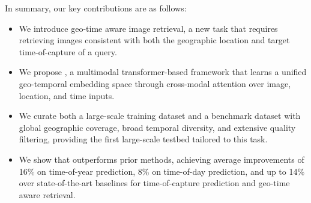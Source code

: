 \noindent In summary, our key contributions are as follows:
\begin{itemize}
    \item We introduce geo-time aware image retrieval, a new task that requires retrieving images consistent with both the geographic location and target time-of-capture of a query.
    \item We propose \tiger, a multimodal transformer-based framework that learns a unified geo-temporal embedding space through cross-modal attention over image, location, and time inputs.
    \item We curate both a large-scale training dataset and a benchmark dataset with global geographic coverage, broad temporal diversity, and extensive quality filtering, providing the first large-scale testbed tailored to this task.
    \item We show that \tiger outperforms prior methods, achieving average improvements of 16\% on time-of-year prediction, 8\% on time-of-day prediction, and up to 14\% over state-of-the-art baselines for time-of-capture prediction and geo-time aware retrieval.
\end{itemize}